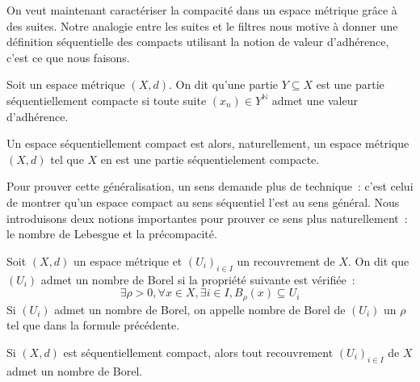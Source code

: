 On veut maintenant caractériser la compacité dans un espace métrique grâce à des
suites. Notre analogie entre les suites et le filtres nous motive à donner une
définition séquentielle des compacts utilisant la notion de valeur d'adhérence,
c'est ce que nous faisons.

\begin{definition}
  Soit un espace métrique $(X,d)$. On dit qu'une partie $Y\subseteq X$ est une
  partie séquentiellement compacte si toute suite $(x_n)\in Y^\mathbb N$ admet
  une valeur d'adhérence.
\end{definition}

Un espace séquentiellement compact est alors, naturellement, un espace métrique
$(X,d)$ tel que $X$ en est une partie séquentielement compacte.

Pour prouver cette généralisation, un sens demande plus de technique~: c'est
celui de montrer qu'un espace compact au sens séquentiel l'est au sens général.
Nous introduisons deux notions importantes pour prouver ce sens plus
naturellement~: le nombre de Lebesgue et la précompacité.

\begin{definition}
  Soit $(X,d)$ un espace métrique et $(U_i)_{i\in I}$ un recouvrement de $X$. On
  dit que $(U_i)$ admet un nombre de Borel si la propriété suivante est
  vérifiée~:
  \[\exists \rho > 0,\forall x \in X, \exists i \in I, B_\rho(x) \subseteq U_i \]
  Si $(U_i)$ admet un nombre de Borel, on appelle nombre de Borel de $(U_i)$ un
  $\rho$ tel que dans la formule précédente.
\end{definition}

\begin{lemma}\label{lem.nb.lebesgue}
  Si $(X,d)$ est séquentiellement compact, alors tout recouvrement
  $(U_i)_{i\in I}$ de $X$ admet un nombre de Borel.
\end{lemma}

